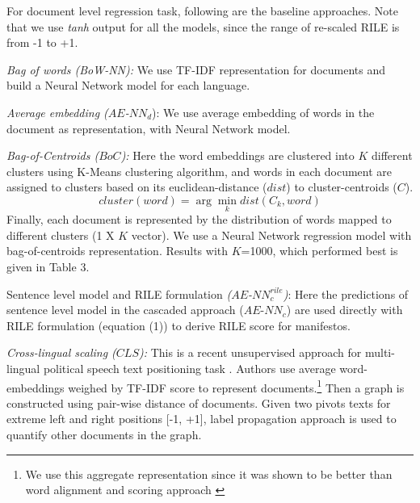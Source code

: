 \documentclass[11pt,a4paper]{article}
\newcommand{\argmin}{\arg\!\min}
\begin{document}
For document level regression task, following are the baseline approaches. Note that we use \textit{tanh} output for all the models, since the range of re-scaled RILE is from -1 to +1.

\begin{description}
\item{\textit{Bag of words (BoW-NN):}} We use TF-IDF representation for documents and build a Neural Network model  for each language.
\item{\textit{Average embedding ($AE$-$NN_{d}$}):} We use average embedding of words in the document as representation, with Neural Network model.

\item{\textit{Bag-of-Centroids ($BoC$):}} Here the word embeddings are clustered into $K$ different clusters using K-Means clustering algorithm, and  words in each document are assigned to clusters based on its euclidean-distance ($dist$) to cluster-centroids ($C$). 
\[ cluster (word) = \argmin_k dist(C_{k}, word) \]
Finally, each document is represented by the distribution of words mapped to different clusters (1 X $K$ vector). We use a Neural Network regression model with bag-of-centroids representation. Results with $K$=1000, which performed best is given in Table 3.

\item{Sentence level model and RILE formulation \textit{($AE$-$NN_{c}^{rile}$)}:} Here the predictions of sentence level model in the cascaded approach ($AE$-$NN_{c}$) are used directly with RILE formulation (equation (1)) to derive RILE score for manifestos.

\item{\textit{Cross-lingual scaling ($CLS$):}} This is a recent unsupervised approach for multi-lingual political speech text positioning task \cite{EACL}. Authors use average word-embeddings weighed by TF-IDF score to represent documents.\footnote{We use this aggregate representation since it was shown to be better than word alignment and scoring approach \cite{EACL}} Then a graph is constructed using pair-wise distance of documents. Given two pivots texts for extreme left and right positions [-1, +1], label propagation approach is used to quantify other documents in the graph.
\end{description}
\end{document}

